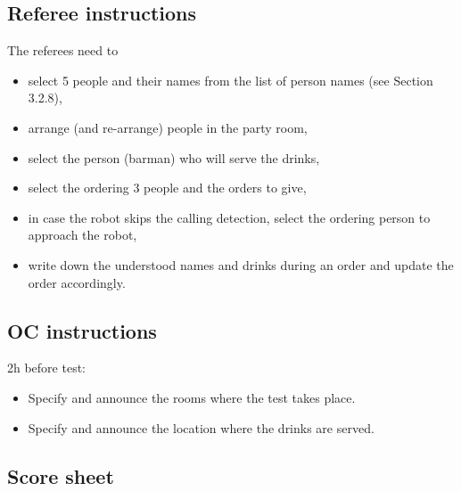 \subsection{Referee instructions}

The referees need to
\begin{itemize}
	\item select 5 people and their names from the list of person names (see Section 3.2.8),
	\item arrange (and re-arrange) people in the party room,
	\item select the person (barman) who will serve the drinks,
	\item select the ordering 3 people and the orders to give,
	\item in case the robot skips the calling detection, select the ordering person to approach the robot,
	\item write down the understood names and drinks during an order and update the order accordingly.
\end{itemize}

\subsection{OC instructions}

2h before test:
\begin{itemize}
	\item Specify and announce the rooms where the test takes place.
	\item Specify and announce the location where the drinks are served.
\end{itemize}

\newpage
\subsection{Score sheet}

